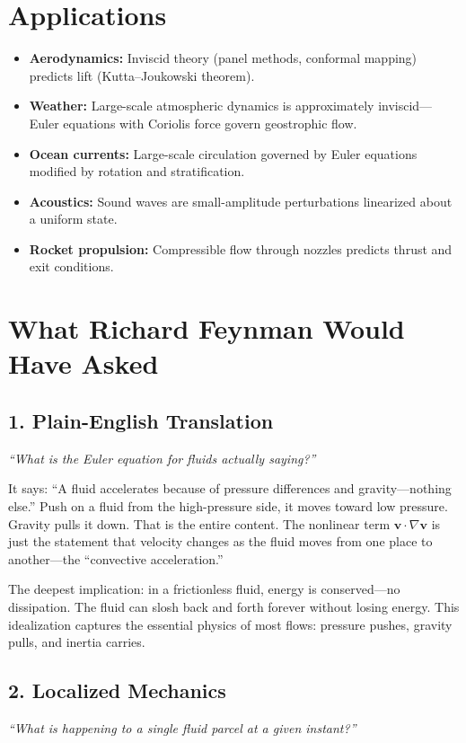 \section*{Applications}

\begin{itemize}
\item \textbf{Aerodynamics:} Inviscid theory (panel methods, conformal mapping) predicts lift (Kutta--Joukowski theorem).
\item \textbf{Weather:} Large-scale atmospheric dynamics is approximately inviscid---Euler equations with Coriolis force govern geostrophic flow.
\item \textbf{Ocean currents:} Large-scale circulation governed by Euler equations modified by rotation and stratification.
\item \textbf{Acoustics:} Sound waves are small-amplitude perturbations linearized about a uniform state.
\item \textbf{Rocket propulsion:} Compressible flow through nozzles predicts thrust and exit conditions.
\end{itemize}
\section*{What Richard Feynman Would Have Asked}

\subsection*{1. Plain-English Translation}
\textit{``What is the Euler equation for fluids actually saying?''}

It says: ``A fluid accelerates because of pressure differences and gravity---nothing else.'' Push on a fluid from the high-pressure side, it moves toward low pressure. Gravity pulls it down. That is the entire content. The nonlinear term $\mathbf{v} \cdot \nabla \mathbf{v}$ is just the statement that velocity changes as the fluid moves from one place to another---the ``convective acceleration.''

The deepest implication: in a frictionless fluid, energy is conserved---no dissipation. The fluid can slosh back and forth forever without losing energy. This idealization captures the essential physics of most flows: pressure pushes, gravity pulls, and inertia carries.

\subsection*{2. Localized Mechanics}
\textit{``What is happening to a single fluid parcel at a given instant?''}

